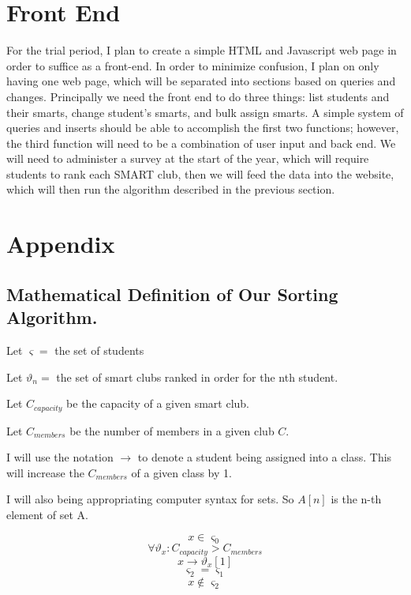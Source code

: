 \documentclass{article}
\begin{document}
\section{Front End}
For the trial period, I plan to create a simple HTML and Javascript web page in order to suffice as a front-end. In order to minimize 
confusion, I plan on only having one web page, which will be separated into sections based on queries and changes. Principally we need the 
front end to do three things: list students and their smarts, change student's smarts, and bulk assign smarts. A simple system of queries and inserts should be able to accomplish the first two functions; however, the third function will need to be a combination of user input and back end. We will need to administer a survey at the start of the year, which will require students to rank each SMART club, then we will feed the data into the website, which will then run the algorithm described in the previous section. 

\section{Appendix}
\subsection{Mathematical Definition of Our Sorting Algorithm. }

Let $\varsigma = $ the set of students

Let $\vartheta_n = $ the set of smart clubs ranked in order for the nth student.

Let $ C_{capacity} $ be the capacity of a given smart club. 

Let $ C_{members} $ be the number of members in a given club $C$.

I will use the notation $\rightarrow$ to denote a student being assigned into a class. This will increase the $C_{members}$ of a given class 
by 1.

I will also being appropriating computer syntax for sets. So $A[n]$ is the n-th element of set A.  

\begin{equation}x \in \varsigma_0 \end{equation}
\begin{equation}
\forall \vartheta_x: C_{capacity} > C_{members} 
\end{equation}
\begin{equation}
x \rightarrow \vartheta_x[1]
\end{equation}
\begin{equation}
\varsigma_2 = \varsigma_1
\end{equation}
\begin{equation}
x \notin \varsigma_2
\end{equation}
\end{document}
